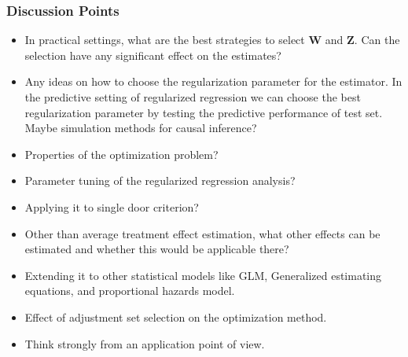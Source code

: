 \documentclass{beamer}
\begin{document}

% 
% 

\begin{frame}
	\frametitle{Discussion Points}
	\begin{itemize}
		\item In practical settings, what are the best strategies to
			select $ \bm{W} $ and $ \bm{Z} $. Can the selection
			have any significant effect on the estimates?
		\item Any ideas on how to choose the regularization parameter for the estimator. In the predictive setting of regularized regression we can choose the best regularization parameter by testing the predictive performance of test set. Maybe simulation methods for causal inference?
		\item Properties of the optimization problem?
		\item Parameter tuning of the regularized regression analysis?
		\item Applying it to single door criterion?
		\item Other than average treatment effect estimation, what other effects can be estimated and whether this would be applicable there?
		\item Extending it to other statistical models like GLM, Generalized estimating equations, and proportional hazards model.
		\item Effect of adjustment set selection on the optimization method.
		\item Think strongly from an application point of view.
	\end{itemize}
\end{frame}
\end{document}
